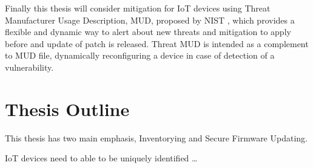 Finally this thesis will consider mitigation for IoT devices using Threat Manufacturer Usage Description, MUD,
proposed by NIST \cite{dodson2021securing}, which provides a flexible and dynamic way to alert about new threats and
mitigation to apply before and update of patch is released. Threat MUD is intended as a complement to MUD file,
dynamically reconfiguring a device in case of detection of a vulnerability.

\section{Thesis Outline}

This thesis has two main emphasis, Inventorying and Secure Firmware Updating.

IoT devices need to able to be uniquely identified \dots
